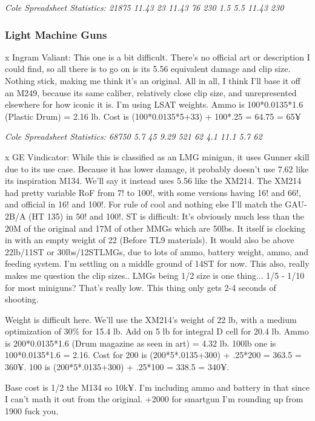 \begin{multicols*}{2}
	\textit{\textcolor{OliveGreen}{Cole Spreadsheet Statistics: 21875 11.43 23 11.43 76 230 1.5 5.5 11.43 230}}
	
	\subsubsection{Light Machine Guns}
	
	x Ingram Valiant: This one is a bit difficult. There's no official art or description I could find, so all there is to go on is its 5.56 equivalent damage and clip size. Nothing stick, making me think it's an original. All in all, I think I'll base it off an M249, because its same caliber, relatively close clip size, and unrepresented elsewhere for how iconic it is. I'm using LSAT weights. Ammo is 100*0.0135*1.6 (Plastic Drum) = 2.16 lb. Cost is (100*0.0135*5+33) + 100*.25 = 64.75 = 65¥
	
	\textit{\textcolor{OliveGreen}{Cole Spreadsheet Statistics: 68750 5.7 45 9.29 521 62 4.1 11.1 5.7 62}}
	
	x GE Vindicator: While this is classified as an LMG minigun, it uses Gunner skill due to its use case. Because it has lower damage, it probably doesn't use 7.62 like its inspiration M134. We'll say it instead uses 5.56 like the XM214. The XM214 had pretty variable RoF from 7! to 100!, with some versions having 16! and 66!, and official in 16! and 100!. For rule of cool and nothing else I'll match the GAU-2B/A (HT 135) in 50! and 100!. ST is difficult: It's obviously much less than the 20M of the original and 17M of other MMGs which are 50lbs. It itself is clocking in with an empty weight of 22 (Before TL9 materials). It would also be above 22lb/11ST  or 30lbs/12STLMGs, due to lots of ammo, battery weight, ammo, and feeding system. I'm settling on a middle ground of 14ST for now. This also, really makes me question the clip sizes.. LMGs being 1/2 size is one thing... 1/5 - 1/10 for most miniguns? That's really low. This thing only gets 2-4 seconds of shooting.
	
	Weight is difficult here. We'll use the XM214's weight of 22 lb, with a medium optimization of 30\% for 15.4 lb. Add on 5 lb for integral D cell for 20.4 lb. Ammo is 200*0.0135*1.6 (Drum magazine as seen in art) = 4.32 lb. 100lb one is 100*0.0135*1.6 = 2.16. Cost for 200 is (200*5*.0135+300) + .25*200 = 363.5 = 360¥. 100 is (200*5*.0135+300) + .25*100 = 338.5 = 340¥.
	
	Base cost is 1/2 the M134 so 10k¥. I'm including ammo and battery in that since I can't math it out from the original. +2000 for smartgun I'm rounding up from 1900 fuck you.
	

\end{multicols*}
